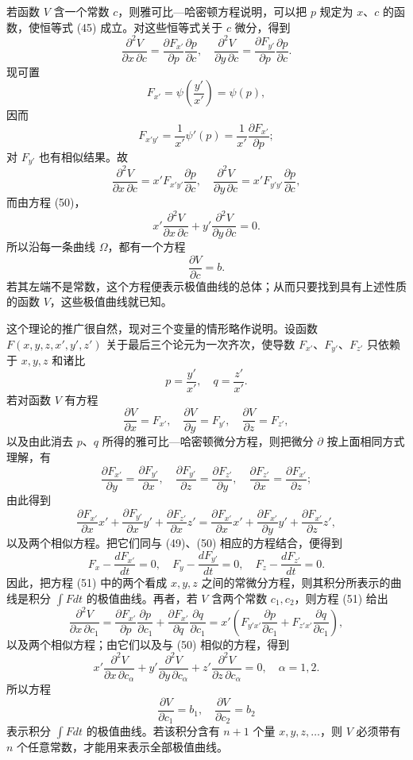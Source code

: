 \documentclass[11pt,a4paper,leqno]{article}
\begin{document}
若函数 $V$ 含一个常数 $c$，则雅可比—哈密顿方程说明，可以把 $p$ 规定为 $x$、$c$ 的函数，使恒等式 (45) 成立。对这些恒等式关于 $c$ 微分，得到
\[
\frac{\partial^2 V}{\partial x\,\partial c}
=
\frac{\partial F_{x'}}{\partial p}\frac{\partial p}{\partial c},\quad
\frac{\partial^2 V}{\partial y\,\partial c}
=
\frac{\partial F_{y'}}{\partial p}\frac{\partial p}{\partial c}.
\]
现可置
\[
F_{x'}=\psi\left(\frac{y'}{x'}\right)=\psi(p),
\]
因而
\[
F_{x'y'}=\frac{1}{x'}\psi'(p)=\frac{1}{x'}\frac{\partial F_{x'}}{\partial p};
\]
对 $F_{y'}$ 也有相似结果。故
\[
\frac{\partial^2 V}{\partial x\,\partial c}
=
x'F_{x'y'}\frac{\partial p}{\partial c},\quad
\frac{\partial^2 V}{\partial y\,\partial c}
=
x'F_{y'y'}\frac{\partial p}{\partial c},
\]
而由方程 (50)，
\[
x'\frac{\partial^2V}{\partial x\,\partial c}
+
y'\frac{\partial^2V}{\partial y\,\partial c}=0.
\]
所以沿每一条曲线 $\Omega$，都有一个方程
\[
\frac{\partial V}{\partial c}=b.
\]
若其左端不是常数，这个方程便表示极值曲线的总体；从而只要找到具有上述性质的函数 $V$，这些极值曲线就已知。

这个理论的推广很自然，现对三个变量的情形略作说明。设函数 $F(x,y,z,x',y',z')$ 关于最后三个论元为一次齐次，使导数 $F_{x'}$、$F_{y'}$、$F_{z'}$ 只依赖于 $x,y,z$ 和诸比
\[
p=\frac{y'}{x'},\quad q=\frac{z'}{x'}.
\]
若对函数 $V$ 有方程
\begin{equation}\tag{51}
\frac{\partial V}{\partial x}=F_{x'},\quad
\frac{\partial V}{\partial y}=F_{y'},\quad
\frac{\partial V}{\partial z}=F_{z'},
\end{equation}
以及由此消去 $p$、$q$ 所得的雅可比—哈密顿微分方程，则把微分 $\partial$ 按上面相同方式理解，有
\[
\frac{\partial F_{x'}}{\partial y}=\frac{\partial F_{y'}}{\partial x},\quad
\frac{\partial F_{y'}}{\partial z}=\frac{\partial F_{z'}}{\partial y},\quad
\frac{\partial F_{z'}}{\partial x}=\frac{\partial F_{x'}}{\partial z};
\]
由此得到
\[
\frac{\partial F_{x'}}{\partial x}x'
+\frac{\partial F_{y'}}{\partial x}y'
+\frac{\partial F_{z'}}{\partial x}z'
=
\frac{\partial F_{x'}}{\partial x}x'
+\frac{\partial F_{x'}}{\partial y}y'
+\frac{\partial F_{x'}}{\partial z}z',
\]
以及两个相似方程。把它们同与 (49)、(50) 相应的方程结合，便得到
\[
F_x-\frac{dF_{x'}}{dt}=0,\quad
F_y-\frac{dF_{y'}}{dt}=0,\quad
F_z-\frac{dF_{z'}}{dt}=0.
\]
因此，把方程 (51) 中的两个看成 $x,y,z$ 之间的常微分方程，则其积分所表示的曲线是积分 $\int Fdt$ 的极值曲线。再者，若 $V$ 含两个常数 $c_1,c_2$，则方程 (51) 给出
\[
\frac{\partial^2V}{\partial x\,\partial c_1}
=
\frac{\partial F_{x'}}{\partial p}\frac{\partial p}{\partial c_1}
+
\frac{\partial F_{x'}}{\partial q}\frac{\partial q}{\partial c_1}
=
x'\left(
F_{y'x'}\frac{\partial p}{\partial c_1}
+
F_{z'x'}\frac{\partial q}{\partial c_1}
\right),
\]
以及两个相似方程；由它们以及与 (50) 相似的方程，得到
\[
x'\frac{\partial^2V}{\partial x\,\partial c_\alpha}
+
y'\frac{\partial^2V}{\partial y\,\partial c_\alpha}
+
z'\frac{\partial^2V}{\partial z\,\partial c_\alpha}
=0,\quad \alpha=1,2.
\]
所以方程
\[
\frac{\partial V}{\partial c_1}=b_1,\quad
\frac{\partial V}{\partial c_2}=b_2
\]
表示积分 $\int Fdt$ 的极值曲线。若该积分含有 $n+1$ 个量 $x,y,z,\ldots$，则 $V$ 必须带有 $n$ 个任意常数，才能用来表示全部极值曲线。
\end{document}
